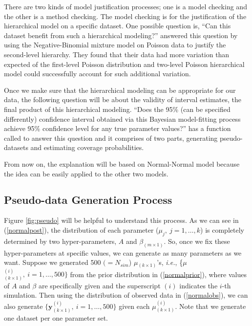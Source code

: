 \documentclass[article]{jss}
\begin{document}
There are two kinds of model justification processes; one is a model checking and the other is a method checking. The model checking is for the justification of the hierarchical model on a specific dataset. One possible question is, ``Can this dataset benefit from such a hierarchical modeling?'' \cite{modelchecking1996} answered this question by using the Negative-Binomial mixture model on Poisson data to justify the second-level hierarchy. They found that their data had more variation than expected of the first-level Poisson distribution and two-level Poisson hierarchical model could successfully account for such additional variation.


Once we make sure that the hierarchical modeling can be appropriate for our data, the following question will be about the validity of interval estimates, the final product of this hierarchical modeling. ``Does the 95\% (can be specified differently) confidence interval obtained via this Bayesian model-fitting process achieve 95\% confidence level  for any true parameter values?''  has a function called  to answer this question and it comprises of two parts, generating pseudo-datasets and estimating coverage probabilities.

From now on, the explanation will be based on Normal-Normal model because the idea can be easily applied to the other two models.

\subsection{Pseudo-data Generation Process}
Figure \ref{fig:pseudo} will be helpful to understand this process. As we can see in (\ref{normalpost}), the distribution of each parameter ($\mu_{j},~j=1,\ldots, k$) is completely determined by two hyper-parameters, $A$ and $\beta_{(m\times1)}$. So, once we fix these hyper-parameters at specific values, we can generate as many parameters as we want. Suppose we generated 500 $(=N_{sim}$) {\boldmath $\mu$}$_{(k\times1)}$'s, \emph{i.e.}, \{{\boldmath $\mu$}$^{(i)}_{(k\times1)},~i=1, \ldots, 500\}$ from the prior distribution in (\ref{normalprior}), where values of $A$ and $\beta$ are specifically given and the superscript $(i)$ indicates the $i$-th simulation. Then using the distribution of observed data in (\ref{normalobs}), we can also generate $\{\mathbf{y}^{(i)}_{(k\times1)},~i=1, \ldots, 500\}$ given each {\boldmath$\mu$}$^{(i)}_{(k\times1)}$. Note that we generate one dataset per one parameter set.
\end{document}
